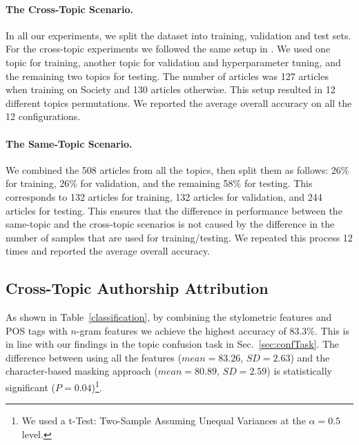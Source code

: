 \documentclass[11pt]{article}
\begin{document}
\paragraph{The Cross-Topic Scenario.} In all our experiments, we split the dataset into training, validation and test sets. For the cross-topic experiments we followed the same setup in \citep{Stamatatos.E:2017}. We used one topic for training, another topic for validation and hyperparameter tuning, and the remaining two topics for testing. The number of articles was 127 articles when training on Society and 130 articles otherwise. This setup resulted in 12 different topics permutations. We reported the average overall accuracy on all the 12 configurations.

\paragraph{The Same-Topic Scenario.} We combined the 508 articles from all the topics, then split them as follows: 26\% for training, 26\% for validation, and the remaining 58\% for testing. This corresponds to 132 articles for training, 132 articles for validation, and 244 articles for testing. This ensures that the difference in performance between the same-topic and the cross-topic scenarios is not caused by the difference in the number of samples that are used for training/testing. We repeated this process 12 times and reported the average overall accuracy.

\subsection{Cross-Topic Authorship Attribution \label{sec:cross}}
As shown in Table~\ref{classification}, by combining the stylometric features and POS tags with $n$-gram features we achieve the highest accuracy of $83.3\%$. This is in line with our findings in the topic confusion task in Sec.~\ref{sec:confTask}. The difference between using all the features ($mean=83.26$, $SD=2.63$) and the character-based masking approach ($mean=80.89$, $SD=2.59$) is statistically significant ($P=0.04$)\footnote{We used a t-Test: Two-Sample Assuming Unequal Variances at the $\alpha = 0.5$ level.}. 
\end{document}
